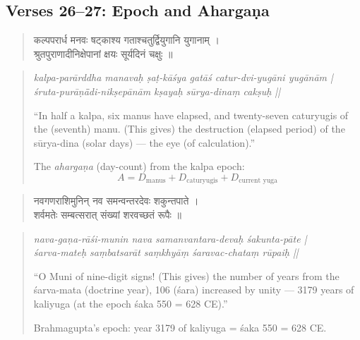 \documentclass[11pt,a4paper]{article}
\newcommand{\dev}[1]{{\devanagarifont #1}}
\theoremstyle{definition}
\begin{document}
\subsection*{Verses 26--27: Epoch and Aharga\d{n}a}



\noindent
\begin{quote}
\dev{कल्पपरार्ध मनवः षट्काश्य गताश्चतुर्द्वियुगानि युगानाम् ।\\
श्रुतपुराणादीनिक्षेपानां क्षयः सूर्यदिनं चक्षुः ॥}
\end{quote}

\hfill\noindent
\begin{quote}
\textit{kalpa-par\=arddha manava\d{h} \d{s}a\d{t}-k\=a\'{s}ya gat\=a\'{s} catur-dvi-yug\=ani yug\=an\=am |\\
\'{s}ruta-pur\=a\d{n}\=\=adi-nik\d{s}ep\=an\=am k\d{s}aya\d{h} s\=urya-dina\d{m} cak\d{s}u\d{h} ||}

``In half a kalpa, six manus have elapsed, and twenty-seven caturyugis of the (seventh) manu. (This gives) the destruction (elapsed period) of the s\=urya-dina (solar days) --- the eye (of calculation).''

The \textit{aharga\d{n}a} (day-count) from the kalpa epoch:
\[
A = D_{\text{manus}} + D_{\text{caturyugis}} + D_{\text{current yuga}}
\]
\end{quote}

\noindent
\begin{quote}
\dev{नवगणराशिमुनिन् नव समन्वन्तरदेवः शकुन्तपाते ।\\
शर्वमतेः सम्बत्सरात् संख्यां शरवच्छतं रूपैः ॥}
\end{quote}

\hfill\noindent
\begin{quote}
\textit{nava-ga\d{n}a-r\=a\'{s}i-munin nava samanvantara-deva\d{h} \'{s}akunta-p\=ate |\\
\'{s}arva-mate\d{h} sa\d{m}batsar\=at sa\d{m}khy\=a\d{m} \'{s}aravac-chata\d{m} r\=upai\d{h} ||}

``O Muni of nine-digit signs! (This gives) the number of years from the \'{s}arva-mata (doctrine year), 106 (\'{s}ara) increased by unity --- 3179 years of kaliyuga (at the epoch \'{s}aka 550 = 628 CE).''

Brahmagupta's epoch: year 3179 of kaliyuga = \'{s}aka 550 = 628 CE.
\end{quote}
\end{document}
